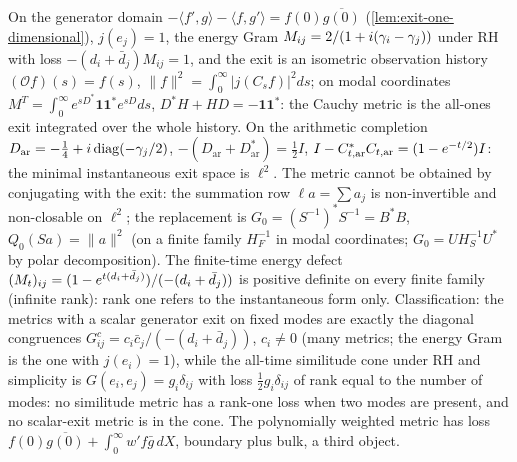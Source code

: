\begin{proposition}
\label{prop:two-exits-two-metrics}
On the generator domain $-\langle f',g\rangle-\langle f,g'\rangle = f(0)\overline{g(0)}$ (\cref{lem:exit-one-dimensional}), $j(e_j) = 1$, the energy Gram
$M_{ij} = 2/(1+i(\gamma_{i}-\gamma_{j}))$ under RH with loss $-(d_i+\bar d_j)M_{ij} = 1$, and the exit is an isometric observation history
$(\mathcal Of)(s) = f(s)$, $\|f\|^2 = \int_0^\infty|j(C_sf)|^2ds$; on modal coordinates $M^{T} = \int_0^\infty e^{sD^{*}}\mathbf 1\mathbf 1^{*}e^{sD}ds$,
$D^{*}H+HD = -\mathbf 1\mathbf 1^{*}$: the Cauchy metric is the all-ones exit integrated over the whole history. On the arithmetic completion
$D_{\mathrm{ar}} = -\tfrac14+i\,\mathrm{diag}(-\gamma_{j}/2)$, $-(D_{\mathrm{ar}}+D_{\mathrm{ar}}^{*}) = \tfrac12I$, $I-C_{t,\mathrm{ar}}^{*}C_{t,\mathrm{ar}} = (1-e^{-t/2})I$: the
minimal instantaneous exit space is $\ell^2$. The metric cannot be obtained by conjugating with the exit: the summation row
$\ell a = \sum a_j$ is non-invertible and non-closable on $\ell^2$; the replacement is $G_0 = (S^{-1})^{*}S^{-1} = B^{*}B$, $Q_0(Sa) = \|a\|^2$
(on a finite family $H_F^{-1}$ in modal coordinates; $G_0 = UH_S^{-1}U^{*}$ by polar decomposition). The finite-time energy defect
$(M_t)_{ij} = (1-e^{t(d_i+\bar d_j)})/(-(d_i+\bar d_j))$ is positive definite on every finite family (infinite rank): rank one refers
to the instantaneous form only. Classification: the metrics with a scalar generator exit on fixed modes are exactly the
diagonal congruences $G^c_{ij} = c_i\bar c_j/(-(d_i+\bar d_j))$, $c_i\ne0$ (many metrics; the energy Gram is the one with $j(e_i) = 1$),
while the all-time similitude cone under RH and simplicity is $G(e_i,e_j) = g_i\delta_{ij}$ with loss $\tfrac12g_i\delta_{ij}$ of rank
equal to the number of modes: no similitude metric has a rank-one loss when two modes are present, and no scalar-exit
metric is in the cone. The polynomially weighted metric has loss $f(0)\overline{g(0)}+\int_0^\infty w'f\bar g\,dX$, boundary plus bulk,
a third object.
\end{proposition}

